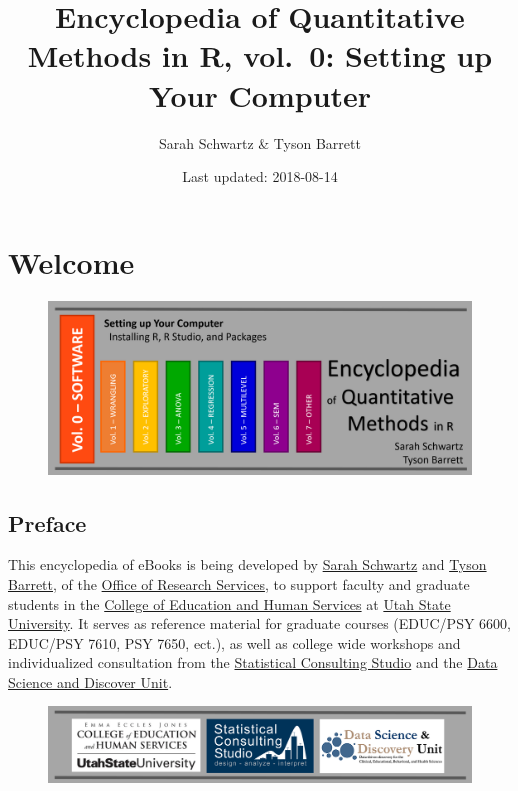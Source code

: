 \documentclass[]{book}
\title{Encyclopedia of Quantitative Methods in R, vol.~0: Setting up Your
Computer}
\author{Sarah Schwartz \& Tyson Barrett}
\date{Last updated: 2018-08-14}
\begin{document}
\maketitle

{
\setcounter{tocdepth}{1}
\tableofcontents
}
\chapter*{Welcome}\label{welcome}

\begin{figure}
\centering
\includegraphics{images/EQM_img/EQM_v0_header.png}
\caption{}
\end{figure}

\section*{Preface}\label{preface}

This encyclopedia of eBooks is being developed by
\href{http://www.sarahschwartzstats.com/}{Sarah Schwartz} and
\href{http://tysonbarrett.com/}{Tyson Barrett}, of the
\href{https://cehs.usu.edu/research/index}{Office of Research Services},
to support faculty and graduate students in the
\href{https://cehs.usu.edu/}{College of Education and Human Services} at
\href{http://www.usu.edu/}{Utah State University}. It serves as
reference material for graduate courses (EDUC/PSY 6600, EDUC/PSY 7610,
PSY 7650, ect.), as well as college wide workshops and individualized
consultation from the
\href{https://cehs.usu.edu/research/statstudio/index}{Statistical
Consulting Studio} and the
\href{https://cehs.usu.edu/research/dsdu/index}{Data Science and
Discover Unit}.

\begin{figure}
\centering
\includegraphics{images/cehs_statstudio_dsdu.PNG}
\caption{}
\end{figure}
\end{document}
